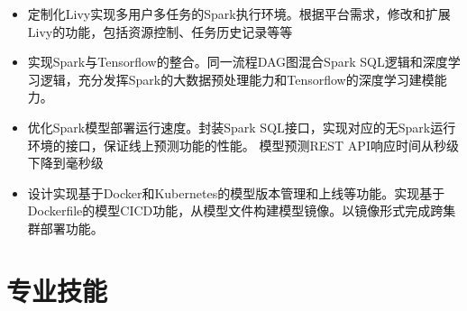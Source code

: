 \documentclass[11pt,a4paper,sans]{moderncv}   %
\begin{document}
\begin{CJK}{UTF8}{gbsn}
{\begin{itemize}
\begin{itemize}
  \item 定制化Livy实现多用户多任务的Spark执行环境。根据平台需求，修改和扩展Livy的功能，包括资源控制、任务历史记录等等
  \item 实现Spark与Tensorflow的整合。同一流程DAG图混合Spark SQL逻辑和深度学习逻辑，充分发挥Spark的大数据预处理能力和Tensorflow的深度学习建模能力。
  \item 优化Spark模型部署运行速度。封装Spark SQL接口，实现对应的无Spark运行环境的接口，保证线上预测功能的性能。
        模型预测REST API响应时间从秒级下降到毫秒级  
  \item 设计实现基于Docker和Kubernetes的模型版本管理和上线等功能。实现基于Dockerfile的模型CICD功能，从模型文件构建模型镜像。以镜像形式完成跨集群部署功能。
  \end{itemize}
\end{itemize}}


\section{专业技能}







\end{CJK}
\end{document}
